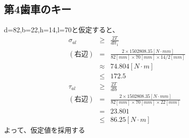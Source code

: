 \subsection{第4歯車のキー}
d=82,b=22,h=14,l=70と仮定すると、
\begin{eqnarray}
\sigma_{al} &\geq& \frac{2T}{dlt_1}\\
(右辺) &=& \frac{2 \times 1502808.35  [N \cdot mm]}{82[mm] \times 70[mm] \times 14/2[mm]}\\
       &\approx&74.804[N \cdot m]\\
       &\leq& 172.5\\
\tau_{al} &\geq& \frac{2T}{dlb}\\
(右辺) &=& \frac{2 \times 1502808.35  [N \cdot mm]}{82[mm] \times 70[mm] \times 22[mm]}\\
       &=& 23.801\\
       &\leq&86.25[N \cdot m]
\end{eqnarray}
よって、仮定値を採用する
